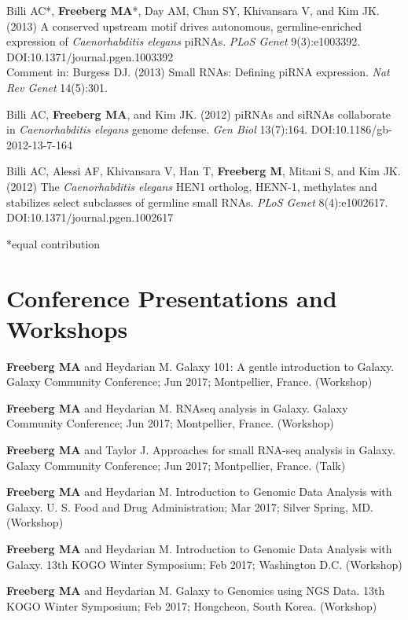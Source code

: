 \documentclass[margin,line]{res}
\begin{document}
\begin{resume}
Billi AC*, {\bf Freeberg MA}*, Day AM, Chun SY, Khivansara V, and Kim JK. (2013) A conserved upstream motif drives autonomous, germline-enriched expression of {\em Caenorhabditis elegans} piRNAs. {\em PLoS Genet} 9(3):e1003392. DOI:10.1371/journal.pgen.1003392\\ Comment in: Burgess DJ. (2013) Small RNAs: Defining piRNA expression. {\em Nat Rev Genet} 14(5):301.

Billi AC, {\bf Freeberg MA}, and Kim JK. (2012) piRNAs and siRNAs collaborate in {\em Caenorhabditis elegans} genome defense. {\em Gen Biol} 13(7):164. DOI:10.1186/gb-2012-13-7-164

Billi AC, Alessi AF, Khivansara V, Han T, {\bf Freeberg M}, Mitani S, and Kim JK. (2012) The {\em Caenorhabditis elegans} HEN1 ortholog, HENN-1, methylates and stabilizes select subclasses of germline small RNAs. {\em PLoS Genet} 8(4):e1002617. DOI:10.1371/journal.pgen.1002617

*equal contribution


\section{\sc Conference Presentations and Workshops}
{ \bf Freeberg MA} and Heydarian M. Galaxy 101: A gentle introduction to Galaxy. Galaxy Community Conference; Jun 2017; Montpellier, France. (Workshop)

{ \bf Freeberg MA} and Heydarian M. RNAseq analysis in Galaxy. Galaxy Community Conference; Jun 2017; Montpellier, France. (Workshop)

{ \bf Freeberg MA} and Taylor J. Approaches for small RNA-seq analysis in Galaxy. Galaxy Community Conference; Jun 2017; Montpellier, France. (Talk)

{ \bf Freeberg MA} and Heydarian M. Introduction to Genomic Data Analysis with Galaxy. U. S. Food and Drug Administration; Mar 2017; Silver Spring, MD. (Workshop)

{ \bf Freeberg MA} and Heydarian M. Introduction to Genomic Data Analysis with Galaxy. 13th KOGO Winter Symposium; Feb 2017; Washington D.C. (Workshop)

{ \bf Freeberg MA} and Heydarian M. Galaxy to Genomics using NGS Data. 13th KOGO Winter Symposium; Feb 2017; Hongcheon, South Korea. (Workshop)


\end{resume}
\end{document}
